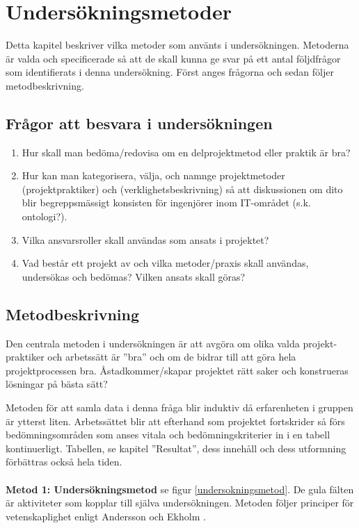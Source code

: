 \documentclass[conference,a4paper]{IEEEtran}
\begin{document}
\section{Undersökningsmetoder} \label{sec:under}
Detta kapitel beskriver vilka metoder som använts i undersökningen. Metoderna är valda och specificerade så att de skall kunna ge svar på ett antal följdfrågor som identifierats i denna undersökning. Först anges frågorna och sedan följer metodbeskrivning.
\subsection{Frågor att besvara i undersökningen}

\begin{enumerate}

\item Hur skall man bedöma/redovisa om en delprojektmetod eller praktik är bra?

\item Hur kan man kategorisera, välja, och namnge projektmetoder (projektpraktiker) och (verklighetsbeskrivning) så att diskussionen om dito blir begreppsmässigt konsisten för ingenjörer inom IT-området (s.k. ontologi?).

\item Vilka ansvarsroller skall användas som ansats i projektet?

\item Vad består ett projekt av och vilka metoder/praxis skall användas, undersökas och bedömas? Vilken ansats skall göras?

\end{enumerate}

\subsection{Metodbeskrivning}
Den centrala metoden i undersökningen är att avgöra om olika valda projekt-praktiker och arbetssätt är ”bra” och om de bidrar till att göra hela projektprocessen bra. Åstadkommer/skapar projektet rätt saker och konstrueras lösningar på bästa sätt?

Metoden för att samla data i denna fråga blir induktiv då erfarenheten i gruppen är ytterst liten. Arbetssättet blir att efterhand som projektet fortskrider så förs bedömningsområden som anses vitala och bedömningskriterier in i en tabell kontinuerligt. Tabellen, se kapitel ”Resultat”, dess innehåll och dess utformning förbättras också hela tiden.\\
\\
\textbf{Metod 1: Undersökningsmetod} se figur \ref{undersokningsmetod}. De gula fälten är aktiviteter som kopplar till själva undersökningen. Metoden följer principer för vetenskaplighet enligt Andersson och Ekholm \cite{Andersson02}.
\end{document}
